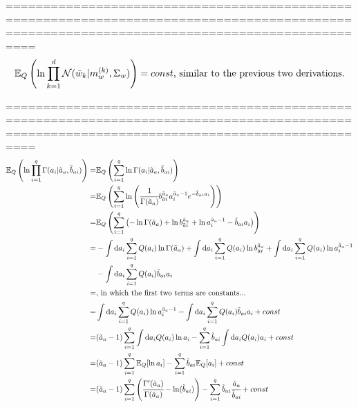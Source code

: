 \documentclass[11pt,notitlepage]{article}
\begin{document}
==============================================================================================================================================
\begin{equation*}
\mathbb{E}_Q \left( \ln \prod_{k=1}^d \mathcal{N} (\tilde{w}_k|m_w^{(k)},\Sigma_w)\right) =  const\text{, similar to the previous two derivations.} \\
\end{equation*}

==============================================================================================================================================
\begin{align*}
\mathbb{E}_Q \left( \ln \prod_{i=1}^q \Gamma (a_i | \tilde{a}_a, \tilde{b}_{ai})\right)=& \mathbb{E}_Q\left( \sum_{i=1}^q \ln \Gamma (a_i | \tilde{a}_a, \tilde{b}_{ai}) \right)\\
=& \mathbb{E}_Q\left( \sum_{i=1}^q \ln \left( \cfrac{1}{\Gamma(\tilde{a}_a)} b_{\tilde{a}i}^{\tilde{a}_a} a_i^{\tilde{a}_a -1} e^{-\tilde{b}_{ai}a_i} \right) \right)\\
=& \mathbb{E}_Q\left( \sum_{i=1}^q \left( - \ln\Gamma(\tilde{a}_a) +\ln b_{\tilde{a}i}^{\tilde{a}_a} +\ln a_i^{\tilde{a}_a -1} - \tilde{b}_{ai}a_i  \right) \right)\\
=& -\int \mathrm{d}a_i \sum_{i=1}^q  Q(a_i) \ln\Gamma(\tilde{a}_a) + \int \mathrm{d}a_i \sum_{i=1}^q  Q(a_i) \ln b_{\tilde{a}i}^{\tilde{a}_a} + \int \mathrm{d}a_i \sum_{i=1}^q  Q(a_i) \ln a_i^{\tilde{a}_a -1}\\
& - \int \mathrm{d}a_i \sum_{i=1}^q  Q(a_i) \tilde{b}_{ai}a_i\\
=&\text{, in which the first two terms are constants...}\\
=&\int \mathrm{d}a_i \sum_{i=1}^q  Q(a_i) \ln a_i^{\tilde{a}_a -1} - \int \mathrm{d}a_i \sum_{i=1}^q  Q(a_i) \tilde{b}_{ai}a_i +const\\
=& (\tilde{a}_a -1)\sum_{i=1}^q \int \mathrm{d}a_i   Q(a_i) \ln a_i - \sum_{i=1}^q \tilde{b}_{ai} \int \mathrm{d}a_i  Q(a_i) a_i +const\\
=&(\tilde{a}_a -1)\sum_{i=1}^q \mathbb{E}_Q[\ln a_i]  - \sum_{i=1}^q \tilde{b}_{ai} \mathbb{E}_Q[a_i]+const\\
=& (\tilde{a}_a -1)\sum_{i=1}^q \left( \cfrac{\Gamma'(\tilde{a}_a)}{\Gamma(\tilde{a}_a)} - \ln(\tilde{b}_{ai})\right)  - \sum_{i=1}^q \tilde{b}_{ai} \cfrac{\tilde{a}_a}{\tilde{b}_{ai}} +const
\end{align*}
\end{document}
